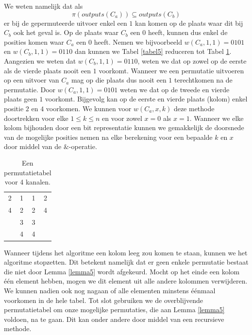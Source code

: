\documentclass{article}
\begin{document}
We weten namelijk dat als \[{\pi\left(outputs\left(C_a\right)\right) \subseteq outputs\left(C_b\right)}\] er bij de gepermuteerde uitvoer enkel een $1$ kan komen op de plaats waar dit bij $C_b$ ook het geval is.
Op de plaats waar $C_b$ een $0$ heeft, kunnen dus enkel de posities komen waar $C_a$ een $0$ heeft.
Nemen we bijvoorbeeld $w\left(C_a,1,1\right) = 0101$ en ${w\left(C_b,1,1\right)=0110}$ dan kunnen we Tabel \ref{tabel5} reduceren tot Tabel \ref{tabel6}.
Aangezien we weten dat $w\left(C_b,1,1\right) = 0110$, weten we dat op zowel op de eerste als de vierde plaats nooit een $1$ voorkomt.
Wanneer we een permutatie uitvoeren op een uitvoer van $C_a$ mag op die plaats dus nooit een $1$ terechtkomen na de permutatie.
Door $w\left(C_a,1,1\right) = 0101$ weten we dat op de tweede en vierde plaats geen $1$ voorkomt.
Bijgevolg kan op de eerste en vierde plaats (kolom) enkel positie $2$ en $4$ voorkomen.
We kunnen voor $w\left(C_a, x, k\right)$ deze methode doortrekken voor elke $1 \leq k \leq n$ en voor zowel $x = 0$ als $x = 1$.
Wanneer we elke kolom bijhouden door een bit representatie kunnen we gemakkelijk de doorsnede van de mogelijke posities nemen na elke berekening voor een bepaalde $k$ en $x$ door middel van de $\&$-operatie. 
\begin{table}[!h]
	\vspace{-5pt}	
	\centering
	\begin{tabular}{|c|c|c|c|}
	\hline
	2 & 1 & 1 & 2 \\ 
	4 & 2 & 2 & 4\\ 
	 & 3 & 3 &  \\
	 & 4 & 4 & \\ 
	\hline 
	\end{tabular}
	\caption{Een permutatietabel voor 4 kanalen.}
	\label{tabel6}
\end{table}
\vspace{-5pt}

Wanneer tijdens het algoritme een kolom leeg zou komen te staan, kunnen we het algoritme stopzetten.
Dit betekent namelijk dat er geen enkele permutatie bestaat die niet door Lemma \ref{lemma5} wordt afgekeurd.
Mocht op het einde een kolom \'e\'en element hebben, mogen we dit element uit alle andere kolommen verwijderen.
We kunnen nadien ook nog nagaan of alle elementen minstens \'e\'enmaal voorkomen in de hele tabel.
Tot slot gebruiken we de overblijvende permutatietabel om onze mogelijke permutaties, die aan Lemma \ref{lemma5} voldoen, na te gaan. 
Dit kan onder andere door middel van een recursieve methode.
\end{document}
